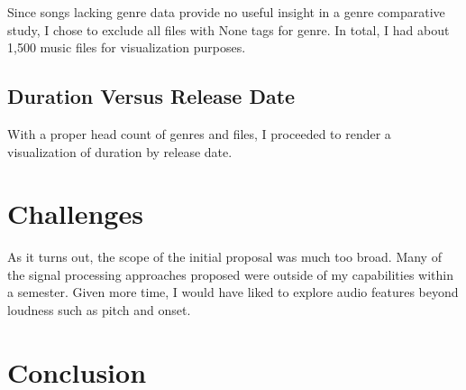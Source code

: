 \documentclass[journal]{vgtc}                %
\begin{document}
Since songs lacking genre data provide no useful insight in a genre comparative
study, I chose to exclude all files with None tags for genre. In total, I had
about 1,500 music files for visualization purposes.

\subsection{Duration Versus Release Date}

With a proper head count of genres and files, I proceeded to render a
visualization of duration by release date.

\section{Challenges}

As it turns out, the scope of the initial proposal was much too broad. Many of
the signal processing approaches proposed were outside of my capabilities within
a semester. Given more time, I would have liked to explore audio features beyond
loudness such as pitch and onset.

\section{Conclusion}

%

%
%
%


\end{document}
